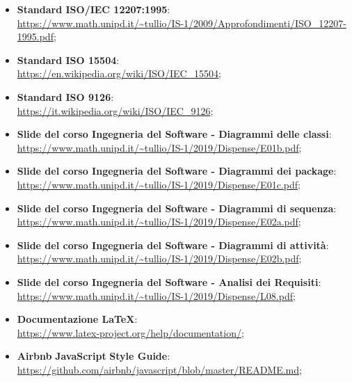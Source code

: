 	\begin{itemize}
		\item \textbf{Standard ISO/IEC 12207:1995}: \\
			\url{https://www.math.unipd.it/~tullio/IS-1/2009/Approfondimenti/ISO_12207-1995.pdf};
			
		\item \textbf{Standard ISO 15504}: \\
		\url{https://en.wikipedia.org/wiki/ISO/IEC_15504};
		
		\item \textbf{Standard ISO 9126}: \\
		\url{https://it.wikipedia.org/wiki/ISO/IEC_9126};
		
		\item \textbf{Slide del corso Ingegneria del Software - Diagrammi delle classi}: \\
			\url{https://www.math.unipd.it/~tullio/IS-1/2019/Dispense/E01b.pdf};
		
		\item \textbf{Slide del corso Ingegneria del Software - Diagrammi dei package}:\\ 
			\url{https://www.math.unipd.it/~tullio/IS-1/2019/Dispense/E01c.pdf};
		
		\item \textbf{Slide del corso Ingegneria del Software - Diagrammi di sequenza}: \\
			\url{https://www.math.unipd.it/~tullio/IS-1/2019/Dispense/E02a.pdf};
		
		\item \textbf{Slide del corso Ingegneria del Software - Diagrammi di attività}: \\
			\url{https://www.math.unipd.it/~tullio/IS-1/2019/Dispense/E02b.pdf};
			
		\item \textbf{Slide del corso Ingegneria del Software - Analisi dei Requisiti}: \\
			\url{https://www.math.unipd.it/~tullio/IS-1/2019/Dispense/L08.pdf};
		
		\item \textbf{Documentazione \LaTeX{}}: \\
			\url{https://www.latex-project.org/help/documentation/};
	
		\item \textbf{Airbnb} \textbf{JavaScript} \textbf{Style Guide}: \\ 
			\url{https://github.com/airbnb/javascript/blob/master/README.md};
		

\end{itemize}
